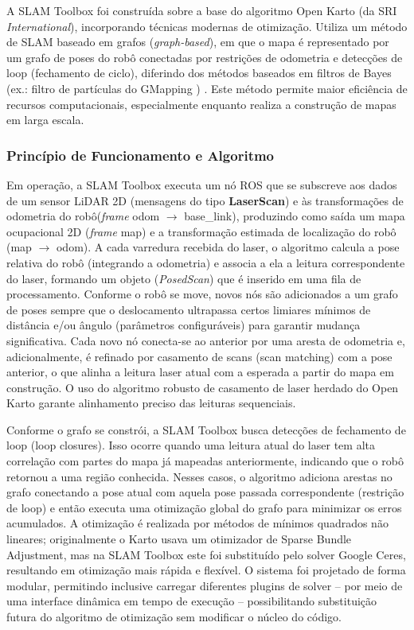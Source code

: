     A SLAM Toolbox foi construída sobre a base do algoritmo Open Karto (da SRI \textit{International}), incorporando técnicas modernas de otimização. Utiliza um método de SLAM baseado em grafos (\textit{graph-based}), em que o mapa é representado por um grafo de poses do robô conectadas por restrições de odometria e detecções de loop (fechamento de ciclo), diferindo dos métodos baseados em filtros de Bayes \cite{2023bayesian} (ex.: filtro de partículas do GMapping \cite{Grisetti2007}) \cite{Thrun2005}. Este método permite maior eficiência de recursos computacionais, especialmente enquanto realiza a construção de mapas em larga escala.

    \subsubsection{Princípio de Funcionamento e Algoritmo}

    Em operação, a SLAM Toolbox executa um nó ROS que se subscreve aos dados de um sensor LiDAR 2D (mensagens do tipo \textbf{LaserScan}) e às transformações de odometria do robô(\textit{frame} odom $\rightarrow$ base\_link), produzindo como saída um mapa ocupacional 2D (\textit{frame} map) e a transformação estimada de localização do robô (map $\rightarrow$ odom). A cada varredura recebida do laser, o algoritmo calcula a pose relativa do robô (integrando a odometria) e associa a ela a leitura correspondente do laser, formando um objeto (\textit{PosedScan}) que é inserido em uma fila de processamento. Conforme o robô se move, novos nós são adicionados a um grafo de poses sempre que o deslocamento ultrapassa certos limiares mínimos de distância e/ou ângulo (parâmetros configuráveis) para garantir mudança significativa. Cada novo nó conecta-se ao anterior por uma aresta de odometria e, adicionalmente, é refinado por casamento de scans (scan matching) com a pose anterior, o que alinha a leitura laser atual com a esperada a partir do mapa em construção. O uso do algoritmo robusto de casamento de laser herdado do Open Karto garante alinhamento preciso das leituras sequenciais.

    Conforme o grafo se constrói, a SLAM Toolbox busca detecções de fechamento de loop (loop closures). Isso ocorre quando uma leitura atual do laser tem alta correlação com partes do mapa já mapeadas anteriormente, indicando que o robô retornou a uma região conhecida. Nesses casos, o algoritmo adiciona arestas no grafo conectando a pose atual com aquela pose passada correspondente (restrição de loop) e então executa uma otimização global do grafo para minimizar os erros acumulados. A otimização é realizada por métodos de mínimos quadrados não lineares; originalmente o Karto usava um otimizador de Sparse Bundle Adjustment, mas na SLAM Toolbox este foi substituído pelo solver Google Ceres, resultando em otimização mais rápida e flexível\cite{Macenski2021}. O sistema foi projetado de forma modular, permitindo inclusive carregar diferentes plugins de solver – por meio de uma interface dinâmica em tempo de execução – possibilitando substituição futura do algoritmo de otimização sem modificar o núcleo do código.

